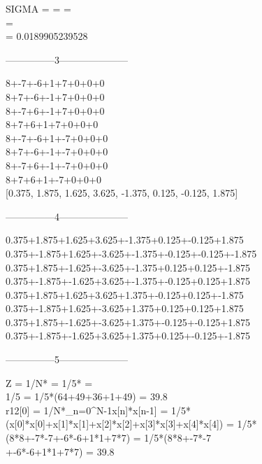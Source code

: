 \documentclass[landscape,12pt]{article}
\begin{document}
SIGMA =  =  =\\  = \\  = 0.0189905239528

\begin{center}
---------------3---------------------
\end{center}
8+-7+-6+1+7+0+0+0\\
8+7+-6+-1+7+0+0+0\\
8+-7+6+-1+7+0+0+0\\
8+7+6+1+7+0+0+0\\
8+-7+-6+1+-7+0+0+0\\
8+7+-6+-1+-7+0+0+0\\
8+-7+6+-1+-7+0+0+0\\
8+7+6+1+-7+0+0+0\\

[0.375, 1.875, 1.625, 3.625, -1.375, 0.125, -0.125, 1.875]


\begin{center}
---------------4---------------------
\end{center}
0.375+1.875+1.625+3.625+-1.375+0.125+-0.125+1.875\\
0.375+-1.875+1.625+-3.625+-1.375+-0.125+-0.125+-1.875\\
0.375+1.875+-1.625+-3.625+-1.375+0.125+0.125+-1.875\\
0.375+-1.875+-1.625+3.625+-1.375+-0.125+0.125+1.875\\
0.375+1.875+1.625+3.625+1.375+-0.125+0.125+-1.875\\
0.375+-1.875+1.625+-3.625+1.375+0.125+0.125+1.875\\
0.375+1.875+-1.625+-3.625+1.375+-0.125+-0.125+1.875\\
0.375+-1.875+-1.625+3.625+1.375+0.125+-0.125+-1.875\\

\begin{center}
---------------5---------------------
\end{center}

Z = 1/N* = 1/5* = \\1/5 = 1/5*(64+49+36+1+49) = 39.8\\

r12[0] = 1/N*\sum_{n=0}^{N-1}{x[n]*x[n-1]} = 1/5*(x[0]*x[0]+x[1]*x[1]+x[2]*x[2]+x[3]*x[3]+x[4]*x[4]) = 1/5*(8*8+-7*-7+-6*-6+1*1+7*7) = 1/5*(8*8+-7*-7\\
+-6*-6+1*1+7*7) = 39.8\\
\end{document}
